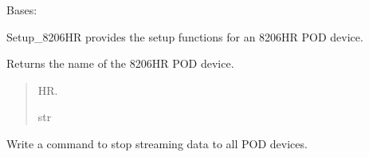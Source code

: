 \documentclass[letterpaper,10pt,english]{sphinxmanual}
\begin{document}
\begin{fulllineitems}
\label{\detokenize{Setup_8206HR:Setup_8206HR.Setup_8206HR}}
\pysigstartsignatures
{}
\pysigstopsignatures
\sphinxAtStartPar
Bases: {\hyperref[\detokenize{Setup_PodInterface:Setup_PodInterface.Setup_Interface}]{}}

\sphinxAtStartPar
Setup\_8206HR provides the setup functions for an 8206\sphinxhyphen{}HR POD device.

\begin{fulllineitems}
\label{\detokenize{Setup_8206HR:Setup_8206HR.Setup_8206HR.GetDeviceName}}
\pysigstartsignatures
{}
\pysigstopsignatures
\sphinxAtStartPar
Returns the name of the 8206\sphinxhyphen{}HR POD device.
\begin{quote}\begin{description}
\sphinxhyphen{}HR.

\sphinxAtStartPar
str

\end{description}\end{quote}

\end{fulllineitems}


\begin{fulllineitems}
\label{\detokenize{Setup_8206HR:Setup_8206HR.Setup_8206HR.StopStream}}
\pysigstartsignatures
{}
\pysigstopsignatures
\sphinxAtStartPar
Write a command to stop streaming data to all POD devices.

\end{fulllineitems}



\end{fulllineitems}
\end{document}
